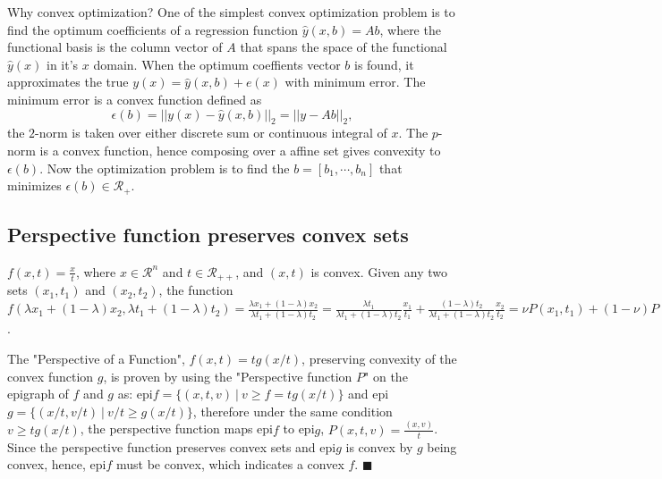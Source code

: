


%
Why convex optimization? 
One of the simplest convex optimization problem is to find the optimum coefficients of a regression function $\hat{y}(x,b) = Ab$, where the functional basis is the column vector of $A$ that spans the space of the functional $\hat{y}(x)$ in it's $x$ domain.
When the optimum coeffients vector $b$ is found, it approximates the true $y(x) = \hat{y}(x,b) + e(x)$ with minimum error.
The minimum error is a convex function defined as 
\begin{equation}
    \epsilon(b) = ||y(x) - \hat{y}(x,b)||_2 = || y - Ab ||_2, 
\end{equation}
the $2$-norm is taken over either discrete sum or continuous integral of $x$.
The $p$-norm is a convex function, hence composing over a affine set gives convexity to $\epsilon(b)$.
Now the optimization problem is to find the $b = [b_1, \cdots, b_n]$ that minimizes $\epsilon(b) \in \mathcal{R}_+$. 


\subsection{Perspective function preserves convex sets}
$f(x,t) = \frac{x}{t}$, where $x \in \mathcal{R}^n$ and $t \in \mathcal{R}_{++}$, and $(x,t)$ is convex.
Given any two sets $(x_1,t_1)$ and $(x_2,t_2)$, the function
$f(\lambda x_1 + (1-\lambda) x_2, \lambda t_1 + (1-\lambda)t_2) = \frac{\lambda x_1 + (1-\lambda)x_2}{\lambda t_1 + (1-\lambda)t_2} = \frac{\lambda t_1}{\lambda t_1 + (1-\lambda)t_2}\frac{x_1}{t_1} + \frac{(1-\lambda)t_2}{\lambda t_1 + (1-\lambda)t_2}\frac{x_2}{t_2} = \nu P(x_1,t_1) + (1-\nu) P(x_2,t_2)$.

The "Perspective of a Function", $f(x,t) = t g(x/t)$, preserving convexity of the convex function $g$, is proven by using the "Perspective function $P$" on the epigraph of $f$ and $g$ as:
epi$f = \{ (x,t,v) \ | \ v \ge f = tg(x/t) \}$ and epi$g = \{ (x/t,v/t) \ | \ v/t \ge g(x/t) \}$, therefore under the same condition $v \ge tg(x/t)$, the perspective function maps epi$f$ to epi$g$, $P(x,t,v) = \frac{(x,v)}{t}$.
Since the perspective function preserves convex sets and epi$g$ is convex by $g$ being convex, hence, epi$f$ must be convex, which indicates a convex $f$. $\blacksquare$ \\

